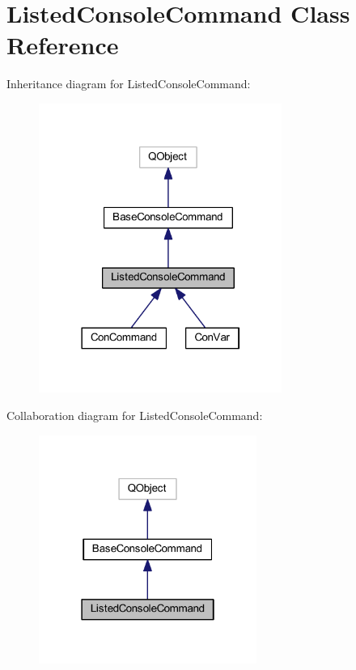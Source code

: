 \hypertarget{class_listed_console_command}{\section{Listed\-Console\-Command Class Reference}
\label{class_listed_console_command}
}


Inheritance diagram for Listed\-Console\-Command\-:\nopagebreak
\begin{figure}[H]
\begin{center}
\leavevmode
\includegraphics[width=225pt]{class_listed_console_command__inherit__graph}
\end{center}
\end{figure}


Collaboration diagram for Listed\-Console\-Command\-:\nopagebreak
\begin{figure}[H]
\begin{center}
\leavevmode
\includegraphics[width=202pt]{class_listed_console_command__coll__graph}
\end{center}
\end{figure}
